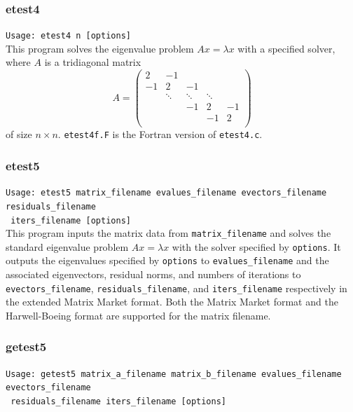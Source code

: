 \documentclass[a4paper]{article}
\begin{document}
\subsubsection{etest4}

\verb+Usage: etest4 n [options]+\\

This program solves the eigenvalue problem $Ax = \lambda x$ with a specified 
solver, where $A$ is a tridiagonal matrix
\[
A = 
\left(
\begin{array}{ccccc}
2 & -1 &   &  &   \\
-1 & 2 & -1 &  &   \\
  & \ddots  & \ddots  & \ddots  &   \\
  &   & -1 & 2 & -1 \\
  &   &   & -1 & 2 \\
\end{array}
\right)
\]
of size $n \times n$.
{\tt etest4f.F} is the Fortran version of {\tt etest4.c}.

\subsubsection{etest5}

\verb+Usage: etest5 matrix_filename evalues_filename evectors_filename residuals_filename +\\
\verb+ iters_filename [options] +\\

This program inputs the matrix data from {\tt matrix\_filename} and
solves the standard eigenvalue problem $Ax=\lambda x$ with
the solver specified by {\tt options}. 
It outputs the eigenvalues specified by {\tt options} to 
{\tt evalues\_filename} and the associated 
eigenvectors, residual norms, and numbers of iterations  
to \\ {\tt evectors\_filename}, {\tt residuals\_filename}, 
and {\tt iters\_filename} respectively in the extended 
Matrix Market format.
Both the Matrix Market format and the Harwell-Boeing format are
supported for the matrix filename. 

\subsubsection{getest5}

\verb+Usage: getest5 matrix_a_filename matrix_b_filename evalues_filename evectors_filename +\\
\verb+ residuals_filename iters_filename [options] +\\
\end{document}
